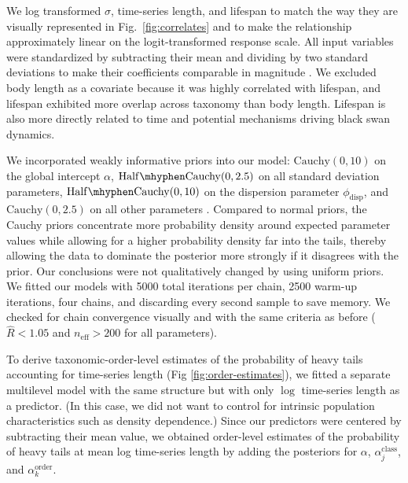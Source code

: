 We log transformed $\sigma$, time-series length, and lifespan to match the way
they are visually represented in Fig.~\ref{fig:correlates} and to make the
relationship approximately linear on the logit-transformed response scale. All
input variables were standardized by subtracting their mean and dividing by two
standard deviations to make their coefficients comparable in magnitude
\citep{gelman2008c}. We excluded body length as a covariate because it was
highly correlated with lifespan, and lifespan exhibited more overlap across
taxonomy than body length. Lifespan is also more directly related to time and
potential mechanisms driving black swan dynamics.

We incorporated weakly informative priors into our model: $\mathrm{Cauchy}(0,
10)$ on the global intercept $\alpha$, $\mathrm{Half\mhyphen Cauchy}(0, 2.5)$ on
all standard deviation parameters, $\mathrm{Half\mhyphen Cauchy}(0, 10)$ on the
dispersion parameter $\phi_\mathrm{disp}$, and $\mathrm{Cauchy}(0, 2.5)$ on all
other parameters \citep{gelman2006c, gelman2008d}. Compared to normal priors,
the Cauchy priors concentrate more probability density around expected parameter
values while allowing for a higher probability density far into the tails, thereby
allowing the data to dominate the posterior more strongly if it disagrees with
the prior. Our conclusions were not qualitatively changed by using uniform
priors. We fitted our models with 5000 total iterations per chain, 2500 warm-up
iterations, four chains, and discarding every second sample to save memory. We
checked for chain convergence visually and with the same criteria as before
($\widehat{R} < 1.05$ and $n_\mathrm{eff} >200$ for all parameters).

To derive taxonomic-order-level estimates of the probability of heavy tails
accounting for time-series length (Fig \ref{fig:order-estimates}), we fitted
a separate multilevel model with the same structure but with only $\log$
time-series length as a predictor. (In this case, we did not want to control
for intrinsic population characteristics such as density dependence.) Since our
predictors were centered by subtracting their mean value, we obtained
order-level estimates of the probability of heavy tails at mean log time-series
length by adding the posteriors for $\alpha$, $\alpha^\mathrm{class}_j$, and
$\alpha^\mathrm{order}_k$.




